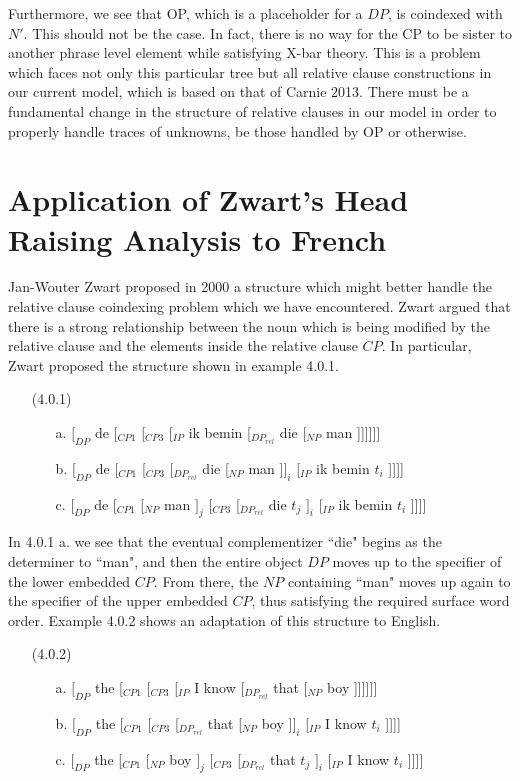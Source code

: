 \documentclass{article}
\begin{document}
Furthermore, we see that OP, which is a placeholder for a $DP$, is coindexed with $N'$. This should not be the case. In fact, there is no way for the CP to be sister to another phrase level element while satisfying X-bar theory. This is a problem which faces not only this particular tree but all relative clause constructions in our current model, which is based on that of Carnie 2013. There must be a fundamental change in the structure of relative clauses in our model in order to properly handle traces of unknowns, be those handled by OP or otherwise.

\section{Application of Zwart's Head Raising Analysis to French}

Jan-Wouter Zwart proposed in 2000 a structure which might better handle the relative clause coindexing problem which we have encountered. Zwart argued that there is a strong relationship between the noun which is being modified by the relative clause and the elements inside the relative clause $CP$. In particular, Zwart proposed the structure shown in example 4.0.1.

\begin{enumerate}
    \item[(4.0.1)] \begin{enumerate}
        \item[a.] $[_{DP}$ de [$_{CP1}$ [$_{CP3}$ [$_{IP}$ ik bemin [$_{DP_{rel}}$ die [$_{NP}$ man ]]]]]]
        \item[b.] $[_{DP}$ de [$_{CP1}$ [$_{CP3}$ [$_{DP_{rel}}$ die [$_{NP}$ man ]$]_i$ [$_{IP}$ ik bemin $t_i$ ]]]]
        \item[c.] $[_{DP}$ de [$_{CP1}$ [$_{NP}$ man $]_j$ [$_{CP3}$ [$_{DP_{rel}}$ die $t_j$ $]_i$ [$_{IP}$ ik bemin $t_i$ ]]]]
    \end{enumerate}
\end{enumerate}

In 4.0.1 a. we see that the eventual complementizer ``die" begins as the determiner to ``man", and then the entire object $DP$ moves up to the specifier of the lower embedded $CP$. From there, the $NP$ containing ``man" moves up again to the specifier of the upper embedded $CP$, thus satisfying the required surface word order. Example 4.0.2 shows an adaptation of this structure to English.

\begin{enumerate}
    \item[(4.0.2)] \begin{enumerate}
        \item[a.] $[_{DP}$ the [$_{CP1}$ [$_{CP3}$ [$_{IP}$ I know [$_{DP_{rel}}$ that [$_{NP}$ boy ]]]]]]
        \item[b.] $[_{DP}$ the [$_{CP1}$ [$_{CP3}$ [$_{DP_{rel}}$ that [$_{NP}$ boy ]$]_i$ [$_{IP}$ I know $t_i$ ]]]]
        \item[c.] $[_{DP}$ the [$_{CP1}$ [$_{NP}$ boy $]_j$ [$_{CP3}$ [$_{DP_{rel}}$ that $t_j$ $]_i$ [$_{IP}$ I know $t_i$ ]]]]
    \end{enumerate}
\end{enumerate}
\end{document}
